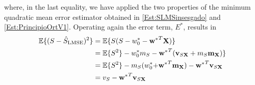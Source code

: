 where, in the last equality, we have applied the two properties of the minimum quadratic mean error estimator obtained in \eqref{Est:SLMSinsesgado} and \eqref{Est:PrincipioOrtV1}. Operating again the error term, $E^*$, results in
\begin{align}
\mathbb{E}\{(S - \hat S_\text{LMSE})^2\} 
   & = \mathbb{E}\{S (S - w_0^* - {{\bf w}^*}^T {\bf X})\}  \nonumber\\
   & = \mathbb{E}\{S^2\} 
     - w_0^* m_S 
     - {{\bf w}^*}^T ({\bf v}_{S{\bf X}} + m_S {\bf m}_{\bf X})\} \nonumber\\
   & = \mathbb{E}\{S^2\} - m_S (w_0^* {+} {{\bf w}^*}^T {\bf m}_{\bf X})
     - {{\bf w}^*}^T {\bf v}_{S{\bf X}}  \nonumber\\
   & = v_S - {{\bf w}^*}^T {\bf v}_{S{\bf X}} 
\end{align}
%


